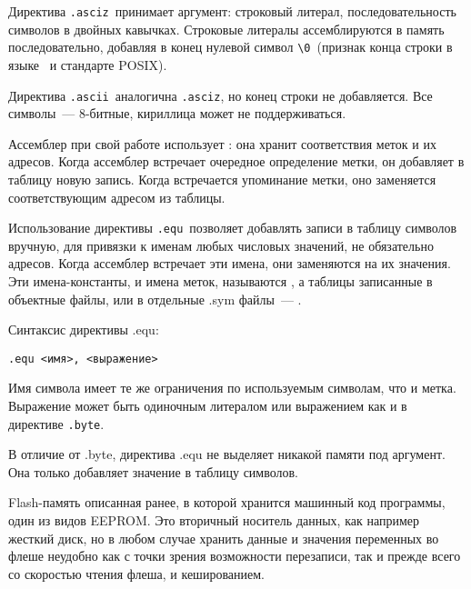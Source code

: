 
Директива \verb|.asciz|\ принимает аргумент: строковый литерал,
последовательность символов в двойных кавычках. Строковые литералы
ассемблируются в память последовательно, добавляя в конец нулевой символ
\verb|\0|\ (признак конца строки в языке \ci\ и стандарте POSIX).

Директива \verb|.ascii|\ аналогична \verb|.asciz|, но конец строки не
добавляется. Все символы\ --- 8-битные, кириллица может не поддерживаться.


Ассемблер при свой работе использует : она хранит соответствия меток и их адресов. Когда ассемблер встречает
очередное определение метки, он добавляет в таблицу новую запись. Когда
встречается упоминание метки, оно заменяется соответствующим адресом из
таблицы.

Использование директивы \verb|.equ|\ позволяет добавлять записи в
таблицу символов вручную, для привязки к именам любых числовых значений, не
обязательно адресов. Когда ассемблер встречает эти имена, они заменяются на их
значения. Эти имена-константы, и имена меток, называются
, а таблицы записанные в объектные файлы, или в
отдельные .sym файлы\ --- .

Синтаксис директивы .equ:

\begin{verbatim}
.equ <имя>, <выражение>
\end{verbatim}

Имя символа имеет те же ограничения по используемым символам, что и метка.
Выражение может быть одиночным литералом или выражением как и в директиве
\verb|.byte|.

\begin{framed}
В отличие от .byte, директива .equ не выделяет никакой памяти под аргумент.
Она только добавляет значение в таблицу символов.  
\end{framed}

\secup

\secup
{}

Flash-память описанная ранее, в которой хранится машинный код программы, один из
видов EEPROM.
Это вторичный носитель данных, как например жесткий диск, но в
любом случае хранить данные и значения переменных во флеше неудобно как с точки
зрения возможности перезаписи, так и прежде всего со скоростью чтения флеша, и
кешированием.

